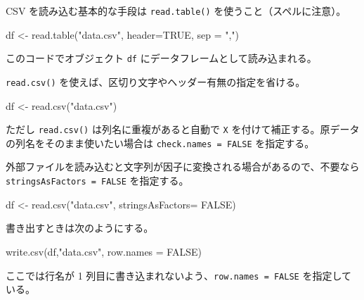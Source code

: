 \documentclass[
  letterpaper,
  xelatex,
  ja=standard, xelatex]{bxjsbook}
\newenvironment{Shaded}{\begin{snugshade}}{\end{snugshade}}
\newcommand{\AttributeTok}[1]{\textcolor[rgb]{0.40,0.45,0.13}{#1}}
\newcommand{\ConstantTok}[1]{\textcolor[rgb]{0.56,0.35,0.01}{#1}}
\newcommand{\FunctionTok}[1]{\textcolor[rgb]{0.28,0.35,0.67}{#1}}
\newcommand{\NormalTok}[1]{\textcolor[rgb]{0.00,0.23,0.31}{#1}}
\newcommand{\OtherTok}[1]{\textcolor[rgb]{0.00,0.23,0.31}{#1}}
\newcommand{\StringTok}[1]{\textcolor[rgb]{0.13,0.47,0.30}{#1}}
\begin{document}
CSV を読み込む基本的な手段は \texttt{read.table()}
を使うこと（スペルに注意）。

\begin{Shaded}
\begin{Highlighting}[]
\NormalTok{df }\OtherTok{\textless{}{-}} \FunctionTok{read.table}\NormalTok{(}\StringTok{"data.csv"}\NormalTok{, }\AttributeTok{header=}\ConstantTok{TRUE}\NormalTok{, }\AttributeTok{sep =} \StringTok{","}\NormalTok{)}
\end{Highlighting}
\end{Shaded}

このコードでオブジェクト \texttt{df}
にデータフレームとして読み込まれる。

\texttt{read.csv()} を使えば、区切り文字やヘッダー有無の指定を省ける。

\begin{Shaded}
\begin{Highlighting}[]
\NormalTok{df }\OtherTok{\textless{}{-}} \FunctionTok{read.csv}\NormalTok{(}\StringTok{"data.csv"}\NormalTok{)}
\end{Highlighting}
\end{Shaded}

ただし \texttt{read.csv()} は列名に重複があると自動で \texttt{X}
を付けて補正する。原データの列名をそのまま使いたい場合は
\texttt{check.names\ =\ FALSE} を指定する。

外部ファイルを読み込むと文字列が因子に変換される場合があるので、不要なら
\texttt{stringsAsFactors\ =\ FALSE} を指定する。

\begin{Shaded}
\begin{Highlighting}[]
\NormalTok{df }\OtherTok{\textless{}{-}} \FunctionTok{read.csv}\NormalTok{(}\StringTok{"data.csv"}\NormalTok{, }\AttributeTok{stringsAsFactors=} \ConstantTok{FALSE}\NormalTok{)}
\end{Highlighting}
\end{Shaded}

書き出すときは次のようにする。

\begin{Shaded}
\begin{Highlighting}[]
\FunctionTok{write.csv}\NormalTok{(df,}\StringTok{"data.csv"}\NormalTok{, }\AttributeTok{row.names =} \ConstantTok{FALSE}\NormalTok{)}
\end{Highlighting}
\end{Shaded}

ここでは行名が 1 列目に書き込まれないよう、\texttt{row.names\ =\ FALSE}
を指定している。
\end{document}
